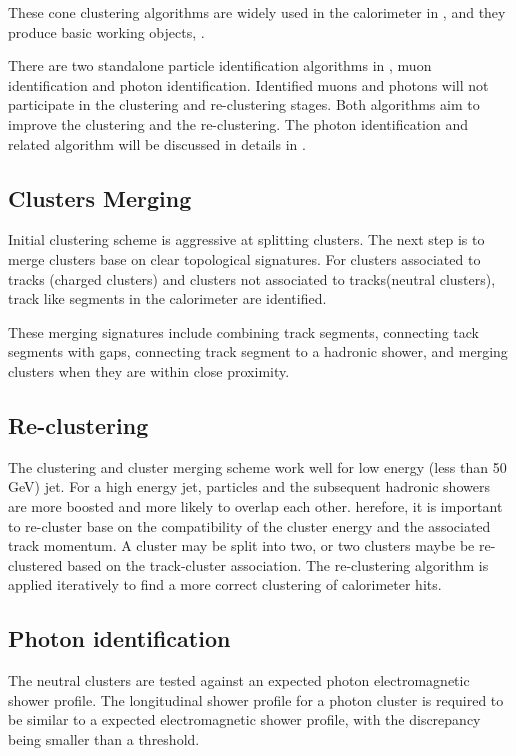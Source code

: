 These cone clustering algorithms are widely used in the calorimeter in \pandora, and they produce basic working objects, \clusters.

There are two standalone particle identification algorithms in \pandora, muon identification and photon identification. Identified muons and photons will not participate in the clustering and re-clustering stages. Both algorithms aim to improve the clustering and the re-clustering. The photon identification and related algorithm will be discussed in details in \Chapter{}.

\subsection{Clusters Merging}

Initial clustering scheme is aggressive at splitting clusters. The next step is to merge clusters base on clear topological signatures. For clusters associated to tracks (charged clusters) and clusters not associated to tracks(neutral clusters), track like segments in the calorimeter are identified.

These merging signatures include combining track segments, connecting tack segments with gaps, connecting track segment to a hadronic shower, and merging clusters when they are within close proximity.

\subsection{Re-clustering}

The clustering and cluster merging scheme work well for low energy (less than 50\,GeV) jet. For a high energy jet, particles and the subsequent hadronic showers are more boosted and more likely to overlap each other. herefore, it is important to re-cluster base on the compatibility of the cluster energy and the associated track momentum. A cluster may be split into two, or two clusters maybe be re-clustered based on the track-cluster association. The re-clustering algorithm is applied iteratively to find a more correct clustering of calorimeter hits.

\subsection{Photon identification}

The neutral clusters are tested against an expected photon electromagnetic shower profile. The longitudinal shower profile for a photon cluster is required to be similar to a expected electromagnetic shower profile, with the discrepancy being smaller than a threshold.

